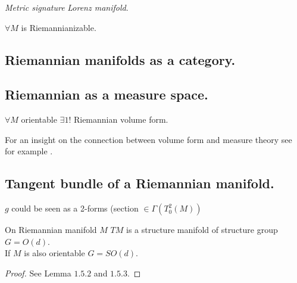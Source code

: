 \documentclass[a4paper,12pt]{scrartcl}    %
\begin{document}
\begin{notationfix}
 \emph{Metric signature} \emph{Lorenz manifold}.
\end{notationfix}

\begin{theorem}
$\forall M$ is Riemannianizable.
\end{theorem}

\subsection{Riemannian manifolds as a category.}
\begin{definition}
\end{definition}

\begin{definition}[Isometry]
\end{definition}

\begin{definition}
\end{definition}

\subsection{Riemannian as a measure space.}
\begin{definition}
\end{definition}

\begin{theorem}
$\forall M$ orientable $\exists1!$ Riemannian volume form.
\end{theorem}

\begin{observation}
For an insight on the connection between volume form and measure theory see for example \cite{Abraham1978}.
\end{observation}

\subsection{Tangent bundle of a Riemannian manifold.}
\begin{observation}
$g$ could be seen as a 2-forms (section $\in \Gamma(T^2_0(M))$
\end{observation}

\begin{definition}
\end{definition}

\begin{theorem}
 On Riemannian manifold $M$ $TM$ is a structure manifold of structure group $G= O(d)$.
 \\
 If $M$ is also orientable $G= SO(d)$.
\end{theorem}
\begin{proof}
 See \cite{Jost2005} Lemma $1.5.2$ and $1.5.3$.
\end{proof}
\end{document}
